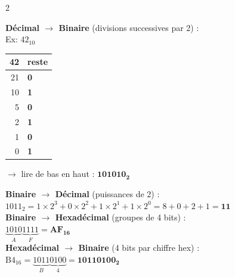 \documentclass[a4paper,10pt]{article}
\begin{document}
\begin{multicols}{2}
\begin{tcolorbox}[basebox, colframe=navy, title=2. Conversions de bases]
\textbf{Décimal $\to$ Binaire} (divisions successives par 2) :\\
Ex: $42_{10}$
\begin{center}
\begin{tabular}{r|l}
42 & reste \\
\hline
21 & \textbf{0} \\
10 & \textbf{1} \\
5  & \textbf{0} \\
2  & \textbf{1} \\
1  & \textbf{0} \\
0  & \textbf{1} \\
\end{tabular}
\quad $\to$ lire de bas en haut : $\mathbf{101010_2}$
\end{center}
\vspace{4pt}
\textbf{Binaire $\to$ Décimal} (puissances de 2) :\\
$1011_2 = 1{\times}2^3 + 0{\times}2^2 + 1{\times}2^1 + 1{\times}2^0 = 8+0+2+1 = \mathbf{11}$\\[4pt]
\textbf{Binaire $\to$ Hexadécimal} (groupes de 4 bits) :\\
$\underbrace{1010}_{A}\underbrace{1111}_{F} = \mathbf{AF_{16}}$\\[4pt]
\textbf{Hexadécimal $\to$ Binaire} (4 bits par chiffre hex) :\\
$\text{B}4_{16} = \underbrace{1011}_{B}\underbrace{0100}_{4} = \mathbf{10110100_2}$
\end{tcolorbox}


\end{multicols}
\end{document}
